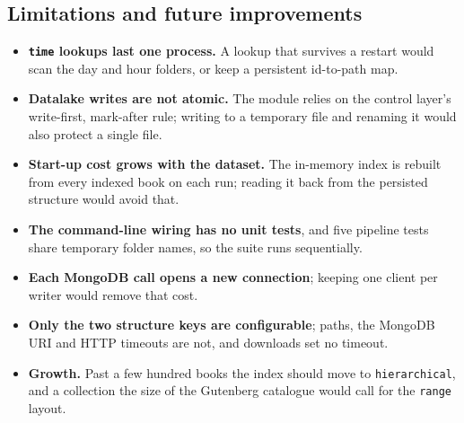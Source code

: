 \documentclass[11pt,a4paper]{article}
\newcommand{\code}[1]{\texttt{#1}}
\begin{document}
\subsection{Limitations and future improvements}
\begin{itemize}
  \item \textbf{\code{time} lookups last one process.} A lookup that survives a restart would scan the
        day and hour folders, or keep a persistent id-to-path map.
  \item \textbf{Datalake writes are not atomic.} The module relies on the control layer's
        write-first, mark-after rule; writing to a temporary file and renaming it would also protect
        a single file.
  \item \textbf{Start-up cost grows with the dataset.} The in-memory index is rebuilt from every
        indexed book on each run; reading it back from the persisted structure would avoid that.
  \item \textbf{The command-line wiring has no unit tests}, and five pipeline tests share temporary
        folder names, so the suite runs sequentially.
  \item \textbf{Each MongoDB call opens a new connection}; keeping one client per writer would remove
        that cost.
  \item \textbf{Only the two structure keys are configurable}; paths, the MongoDB URI and HTTP timeouts
        are not, and downloads set no timeout.
  \item \textbf{Growth.} Past a few hundred books the index should move to \code{hierarchical}, and a
        collection the size of the Gutenberg catalogue would call for the \code{range} layout.
\end{itemize}
\end{document}
